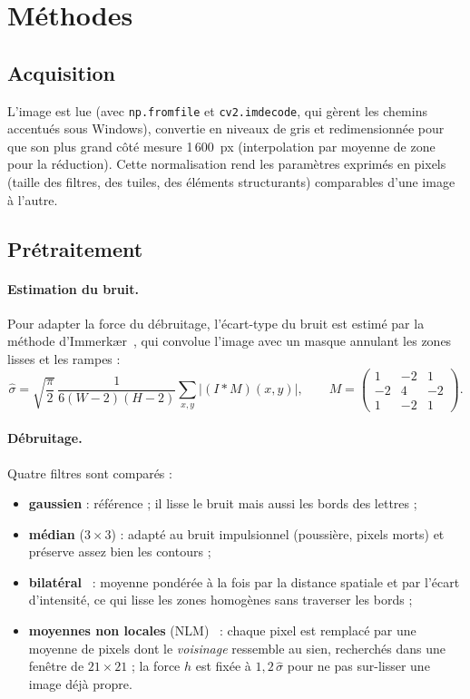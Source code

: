 \documentclass[11pt,a4paper]{article}
\begin{document}
\section{Méthodes}

\subsection{Acquisition}
L'image est lue (avec \texttt{np.fromfile} et \texttt{cv2.imdecode}, qui gèrent les chemins accentués sous Windows), convertie en niveaux de gris et redimensionnée pour que son plus grand côté mesure 1\,600~px (interpolation par moyenne de zone pour la réduction). Cette normalisation rend les paramètres exprimés en pixels (taille des filtres, des tuiles, des éléments structurants) comparables d'une image à l'autre.

\subsection{Prétraitement}

\paragraph{Estimation du bruit.} Pour adapter la force du débruitage, l'écart-type du bruit est estimé par la méthode d'Immerkær~\cite{immerkaer}, qui convolue l'image avec un masque annulant les zones lisses et les rampes :
\[
\hat\sigma = \sqrt{\frac{\pi}{2}}\,\frac{1}{6(W-2)(H-2)}\sum_{x,y}\bigl|(I * M)(x,y)\bigr|,\qquad
M=\begin{pmatrix}1&-2&1\\-2&4&-2\\1&-2&1\end{pmatrix}.
\]

\paragraph{Débruitage.} Quatre filtres sont comparés :
\begin{itemize}
\item \textbf{gaussien} : référence ; il lisse le bruit mais aussi les bords des lettres ;
\item \textbf{médian} ($3\times3$) : adapté au bruit impulsionnel (poussière, pixels morts) et préserve assez bien les contours ;
\item \textbf{bilatéral}~\cite{bilateral} : moyenne pondérée à la fois par la distance spatiale et par l'écart d'intensité, ce qui lisse les zones homogènes sans traverser les bords ;
\item \textbf{moyennes non locales} (NLM)~\cite{nlm} : chaque pixel est remplacé par une moyenne de pixels dont le \emph{voisinage} ressemble au sien, recherchés dans une fenêtre de $21\times21$ ; la force $h$ est fixée à $1{,}2\,\hat\sigma$ pour ne pas sur-lisser une image déjà propre.
\end{itemize}
\end{document}

